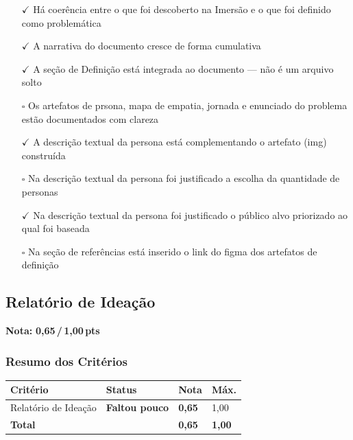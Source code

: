 \documentclass[
  sigconf,
  nonacm, %
  language=portuguese
]{acmart}
\newcommand{\notadestaque}[2]{%
  \noindent\textbf{Nota:}\enspace%
  {\large\bfseries\color{cred}#1\,/\,#2\,pts}%
}
\newcommand{\statuswarn}[1]{{\small\bfseries\color{cwarn}#1}}
\begin{document}
\begin{itemize}[leftmargin=14pt,itemsep=1pt,topsep=3pt,parsep=0pt]
  \item[\textcolor{cgood}{$\checkmark$}] {\small\textcolor{cgood}{Há coerência entre o que foi descoberto na Imersão e o que foi definido como problemática}}
  \item[\textcolor{cgood}{$\checkmark$}] {\small\textcolor{cgood}{A narrativa do documento cresce de forma cumulativa}}
  \item[\textcolor{cgood}{$\checkmark$}] {\small\textcolor{cgood}{A seção de Definição está integrada ao documento — não é um arquivo solto}}
  \item[$\square$] {\small\textcolor{cmuted}{Os artefatos de prsona, mapa de empatia, jornada e enunciado do problema estão documentados com clareza}}
  \item[\textcolor{cgood}{$\checkmark$}] {\small\textcolor{cgood}{A descrição textual da persona está complementando o artefato (img) construída}}
  \item[$\square$] {\small\textcolor{cmuted}{Na descrição textual da persona foi justificado a escolha da quantidade de personas}}
  \item[\textcolor{cgood}{$\checkmark$}] {\small\textcolor{cgood}{Na descrição textual da persona foi justificado o público alvo priorizado ao qual foi baseada}}
  \item[$\square$] {\small\textcolor{cmuted}{Na seção de referências está inserido o link do figma dos artefatos de definição}}
\end{itemize}

\subsection{Relatório de Ideação}

\notadestaque{0,65}{1,00}

\subsubsection*{Resumo dos Critérios}

\begin{tabular}{@{} L{2.6cm} C{2.5cm} C{1.1cm} C{1.1cm} @{}}
\toprule
\textbf{Critério} & \textbf{Status} & \textbf{Nota} & \textbf{Máx.} \\
\midrule
Relatório de Ideação & \statuswarn{Faltou pouco} & \textbf{0,65} & 1,00 \\
\midrule
\textbf{Total} & & \textbf{\color{cred}0,65} & \textbf{1,00} \\
\bottomrule
\end{tabular}
\end{document}
